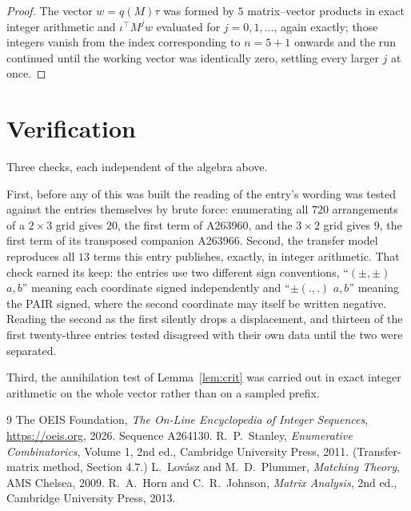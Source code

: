 \documentclass[11pt,a4paper]{article}
\theoremstyle{plain}
\theoremstyle{definition}
\begin{document}
\begin{proof}
The vector $w=q(M)\tau$ was formed by $5$ matrix--vector products in exact integer
arithmetic and $\iota^{\!\top}M^{j}w$ evaluated for $j=0,1,\dots$, again exactly; those
integers vanish from the index corresponding to $n=5+1$ onwards and the run continued
until the working vector was identically zero, settling every larger $j$ at once.
\end{proof}

\section{Verification}

Three checks, each independent of the algebra above.

First, before any of this was built the reading of the entry's wording was tested against the
entries themselves by brute force: enumerating all $720$ arrangements of a $2\times3$ grid
gives $20$, the first term of A263960, and the $3\times2$ grid gives $9$, the first term of its
transposed companion A263966. Second, the transfer model reproduces all $13$ terms this
entry publishes, exactly, in integer arithmetic. That check earned its keep: the entries use
two different sign conventions, ``$(\pm,\pm)$ $a,b$'' meaning each coordinate signed
independently and ``$\pm(.,.)$ $a,b$'' meaning the PAIR signed, where the second coordinate may
itself be written negative. Reading the second as the first silently drops a displacement, and
thirteen of the first twenty-three entries tested disagreed with their own data until the two
were separated.

Third, the annihilation test of Lemma~\ref{lem:crit} was carried out in exact integer
arithmetic on the whole vector rather than on a sampled prefix.

\begin{thebibliography}{9}
 The OEIS Foundation, \emph{The On-Line Encyclopedia of Integer
Sequences}, \url{https://oeis.org}, 2026. Sequence A264130.
 R.~P.~Stanley, \emph{Enumerative Combinatorics}, Volume 1, 2nd ed.,
Cambridge University Press, 2011. (Transfer-matrix method, Section 4.7.)
 L.~Lov\'asz and M.~D.~Plummer, \emph{Matching Theory}, AMS Chelsea, 2009.
 R.~A.~Horn and C.~R.~Johnson, \emph{Matrix Analysis}, 2nd ed., Cambridge
University Press, 2013.
\end{thebibliography}
\end{document}

